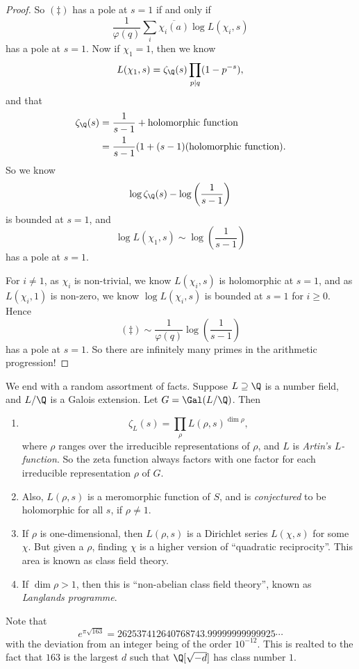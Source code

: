 \documentclass[a4paper]{article}
\begin{document}
\begin{proof}
  So $(\ddagger)$ has a pole at $s = 1$ if and only if
  \[
    \frac{1}{\varphi(q)} \sum_i \overline{\chi_i (a)} \log L(\chi_i, s)
  \]
  has a pole at $s = 1$. Now if $\chi_1 = 1$, then we know
  \[
    L(\chi_1, s) = \zeta_{\Q}(s) \prod_{p \mid q}(1 - p^{-s}),
  \]
  and that
  \begin{align*}
    \zeta_\Q(s) &= \frac{1}{s - 1} + \text{holomorphic function} \\
    &= \frac{1}{s - 1}(1 + (s - 1)(\text{holomorphic function}).
  \end{align*}
  So we know
  \[
    \log \zeta_\Q(s) - \log\left(\frac{1}{s - 1}\right)
  \]
  is bounded at $s = 1$, and
  \[
    \log L(\chi_1, s) \sim \log\left(\frac{1}{s - 1}\right)
  \]
  has a pole at $s = 1$.

  For $i \not= 1$, as $\chi_i$ is non-trivial, we know $L(\chi_i, s)$ is holomorphic at $s = 1$, and as $L(\chi_i, 1)$ is non-zero, we know $\log L(\chi_i, s)$ is bounded at $s = 1$ for $i \geq 0$. Hence
  \[
    (\ddagger) \sim \frac{1}{\varphi(q)} \log\left(\frac{1}{s - 1}\right)
  \]
  has a pole at $s = 1$. So there are infinitely many primes in the arithmetic progression!
\end{proof}

We end with a random assortment of facts. Suppose $L \supseteq \Q$ is a number field, and $L/\Q$ is a Galois extension. Let $G = \Gal(L/\Q)$. Then

\begin{enumerate}
  \item
    \[
      \zeta_L(s) = \prod_{\rho} L(\rho, s)^{\dim \rho},
    \]
    where $\rho$ ranges over the irreducible representations of $\rho$, and $L$ is \emph{Artin's $L$-function}.
    So the zeta function always factors with one factor for each irreducible representation $\rho$ of $G$.
  \item Also, $L(\rho, s)$ is a meromorphic function of $S$, and is \emph{conjectured} to be holomorphic for all $s$, if $\rho \not= 1$.
  \item If $\rho$ is one-dimensional, then $L(\rho, s)$ is a Dirichlet series $L(\chi, s)$ for some $\chi$. But given a $\rho$, finding $\chi$ is a higher version of ``quadratic reciprocity''. This area is known as class field theory.
  \item If $\dim \rho > 1$, then this is ``non-abelian class field theory'', known as \emph{Langlands programme}.
\end{enumerate}

Note that
\[
  e^{\pi\sqrt{163}} = 262537412640768743.99999999999925\cdots
\]
with the deviation from an integer being of the order $10^{-12}$. This is realted to the fact that $163$ is the largest $d$ such that $\Q[\sqrt{-d}]$ has class number $1$.
\end{document}
